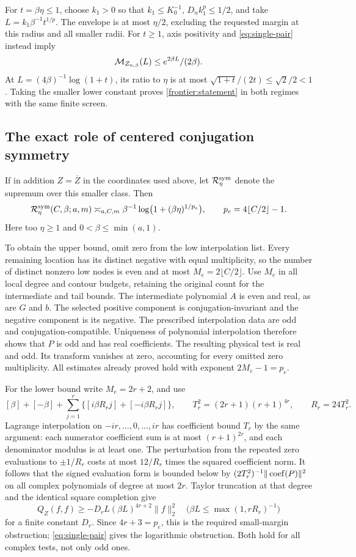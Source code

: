 For \(t=\beta\eta\le1\), choose \(k_1>0\) so that
\(k_1\le K_0^{-1}\), \(D_nk_1^p\le1/2\), and take
\(L=k_1\beta^{-1}t^{1/p}\). The envelope is at most
\(\eta/2\), excluding the requested margin at this radius and
all smaller radii. For \(t\ge1\), axis positivity and
\eqref{eq:single-pair} instead imply
\[
 \mathcal M_{Z_{n,\beta}}(L)\le e^{2\beta L}/(2\beta).
\]
At \(L=(4\beta)^{-1}\log(1+t)\), its ratio to \(\eta\)
is at most \(\sqrt{1+t}/(2t)\le\sqrt2/2<1\).
Taking the smaller lower constant proves
\eqref{frontier:statement} in both regimes with the same finite screen.

\subsection{The exact role of centered conjugation symmetry}
If in addition \(Z=\overline Z\) in the coordinates used above,
let \(\mathcal R_\eta^{\rm sym}\) denote the supremum over this smaller
class. Then
\begin{equation}\label{frontier:symmetric}
 \mathcal R_\eta^{\rm sym}(C,\beta;a,m)
 \asymp_{a,C,m}
 \beta^{-1}\log\bigl(1+(\beta\eta)^{1/p_e}\bigr),\qquad
 p_e=4\lfloor C/2\rfloor-1.
\end{equation}
Here too \(\eta\ge1\) and \(0<\beta\le\min(a,1)\).

To obtain the upper bound, omit zero from the low interpolation list.
Every remaining location has its distinct negative with equal
multiplicity, so the number of distinct nonzero low nodes is even
and at most \(M_e=2\lfloor C/2\rfloor\). Use \(M_e\) in all
local degree and contour budgets, retaining the original count for
the intermediate and tail bounds. The intermediate polynomial
\(A\) is even and real, as are \(G\) and \(b\).
The selected positive component is conjugation-invariant and the
negative component is its negative. The prescribed interpolation
data are odd and conjugation-compatible. Uniqueness of polynomial
interpolation therefore shows that \(P\) is odd and has real
coefficients. The resulting physical test is real and odd. Its
transform vanishes at zero, accounting for every omitted zero
multiplicity. All estimates already proved hold with exponent
\(2M_e-1=p_e\).

For the lower bound write \(M_e=2r+2\), and use
\[
 [\beta]+[-\beta]+\sum_{j=1}^r
        \{[i\beta R_rj]+[-i\beta R_rj]\},\qquad
 T_r^2=(2r+1)(r+1)^{4r},\qquad R_r=24T_r^2.
\]
Lagrange interpolation on \(-ir,\ldots,0,\ldots,ir\)
has coefficient bound \(T_r\) by the same argument: each
numerator coefficient sum is at most \((r+1)^{2r}\), and
each denominator modulus is at least one. The perturbation from
the repeated zero evaluations to \(\pm1/R_r\) costs at most
\(12/R_r\) times the squared coefficient norm. It follows that
the signed evaluation form is bounded below by
\((2T_r^2)^{-1}\|\operatorname{coef}(P)\|^2\) on all complex polynomials
of degree at most \(2r\). Taylor truncation at that degree and
the identical square completion give
\[
 Q_Z(f,f)\ge-D_rL(\beta L)^{4r+2}\|f\|_2^2
 \quad\bigl(\beta L\le\max(1,rR_r)^{-1}\bigr)
\]
for a finite constant \(D_r\). Since \(4r+3=p_e\), this is
the required small-margin obstruction; \eqref{eq:single-pair}
gives the logarithmic obstruction. Both hold for all complex tests,
not only odd ones.


